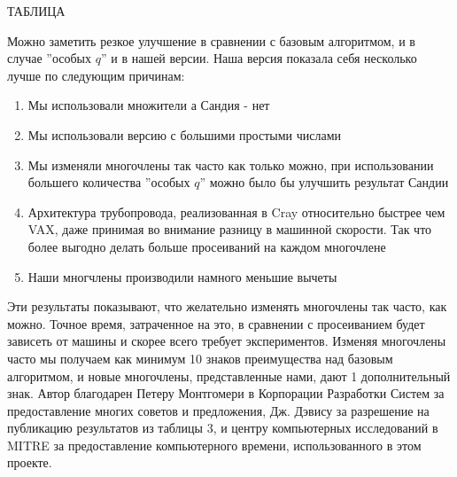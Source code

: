 \documentclass[a4paper,12pt]{report}
\begin{document}
ТАБЛИЦА

Можно заметить резкое улучшение в сравнении с базовым алгоритмом, и в случае ''особых $q$'' и в нашей версии. Наша версия показала себя несколько лучше по следующим причинам:

\begin{enumerate}[label=\roman*]
	\item Мы использовали множители а Сандия - нет
	\item Мы использовали версию с большими простыми числами
	\item Мы изменяли многочлены так часто как только можно, при использовании большего количества ''особых $q$'' можно было бы улучшить результат Сандии
	\item Архитектура трубопровода, реализованная в Cray относительно быстрее чем VAX, даже принимая во внимание разницу в машинной скорости. Так что более выгодно делать больше просеиваний на каждом многочлене
	\item Наши многчлены производили намного меньшие вычеты

\end{enumerate} 

Эти результаты показывают, что желательно изменять многочлены так часто, как можно. Точное время, затраченное на это, в сравнении с просеиванием будет зависеть от машины и скорее всего требует экспериментов. Изменяя многочлены часто мы получаем как минимум 10 знаков преимущества над базовым алгоритмом, и новые многочлены, представленные нами, дают 1 дополнительный знак.
Автор благодарен Петеру Монтгомери в Корпорации Разработки Систем за предоставление многих советов и предложения, Дж. Дэвису за разрешение на публикацию результатов из таблицы 3, и центру компьютерных исследований в MITRE за предоставление компьютерного времени, использованного в этом проекте.

\nocite{*}



\end{document}
